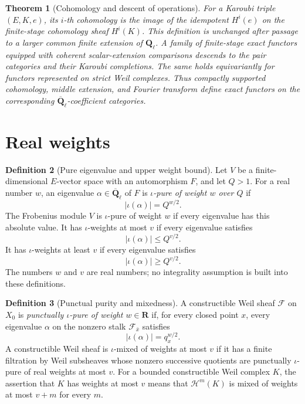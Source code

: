 \documentclass[10pt]{article}
\newtheorem{theorem}{Theorem}[section]
\theoremstyle{definition}
\newtheorem{definition}[theorem]{Definition}
\newcommand{\Ql}{\mathbf Q_\ell}
\newcommand{\Qlb}{\overline{\mathbf Q}_\ell}
\begin{document}
\begin{theorem}[Cohomology and descent of operations]
For a Karoubi triple \((E,K,e)\), its \(i\)-th cohomology is the
image of the idempotent \(H^i(e)\) on the finite-stage cohomology sheaf
\(H^i(K)\).  This definition is unchanged after passage to a larger common
finite extension of \(\Ql\).  A family of finite-stage exact functors equipped with coherent
scalar-extension comparisons descends to the pair categories and their
Karoubi completions.  The same holds equivariantly for functors represented
on strict Weil complexes.  Thus compactly supported cohomology, middle
extension, and Fourier transform define exact functors on the corresponding
\(\Qlb\)-coefficient categories.
\end{theorem}

\section{Real weights}

\begin{definition}[Pure eigenvalue and upper weight bound]
Let \(V\) be a finite-dimensional \(E\)-vector space with an automorphism
\(F\), and let \(Q>1\).  For a real number \(w\), an eigenvalue
\(\alpha\in\Qlb\) of \(F\) is \emph{\(\iota\)-pure of weight \(w\)
over \(Q\)} if
\[
  |\iota(\alpha)|=Q^{w/2}.
\]
The Frobenius module \(V\) is \(\iota\)-pure of weight \(w\) if every
eigenvalue has this absolute value.  It has \(\iota\)-weights at most \(v\)
if every eigenvalue satisfies
\[
  |\iota(\alpha)|\le Q^{v/2}.
\]
It has \(\iota\)-weights at least \(v\) if every eigenvalue satisfies
\[
  |\iota(\alpha)|\ge Q^{v/2}.
\]
The numbers \(w\) and \(v\) are real numbers; no integrality assumption is
built into these definitions.
\end{definition}

\begin{definition}[Punctual purity and mixedness]
A constructible Weil sheaf \(\mathcal F\) on \(X_0\) is
\emph{punctually \(\iota\)-pure of weight \(w\in\mathbf R\)} if, for every
closed point \(x\), every eigenvalue \(\alpha\) on the nonzero stalk
\(\mathcal F_{\bar x}\) satisfies
\[
  |\iota(\alpha)|=q_x^{w/2}.
\]
A constructible Weil sheaf is \(\iota\)-mixed of weights at most \(v\) if it
has a finite filtration by Weil subsheaves whose nonzero successive
quotients are punctually \(\iota\)-pure of real weights at most \(v\).
For a bounded constructible Weil complex \(K\), the assertion that \(K\) has
weights at most \(v\) means that \(\mathcal H^m(K)\) is mixed of weights at
most \(v+m\) for every \(m\).
\end{definition}
\end{document}
